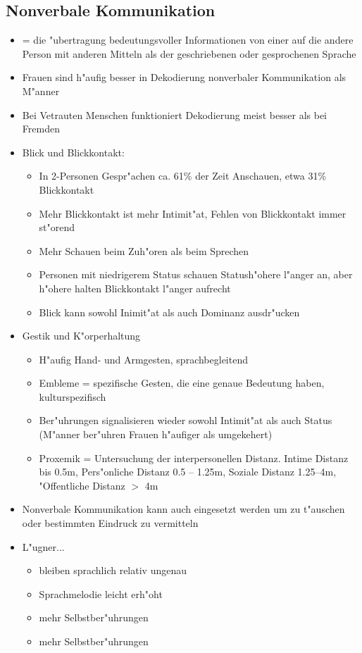 \subsection{Nonverbale Kommunikation}
\begin{itemize}
	\item
		= die "ubertragung bedeutungsvoller Informationen von einer auf die andere Person mit anderen Mitteln als der geschriebenen oder gesprochenen Sprache
	\item
		Frauen sind h"aufig besser in Dekodierung nonverbaler Kommunikation als M"anner

	\item
		Bei Vetrauten Menschen funktioniert Dekodierung meist besser als bei Fremden
	\item
		Blick und Blickkontakt:
		\begin{itemize}
			\item
				In 2-Personen Gespr"achen ca. 61\% der Zeit Anschauen, etwa 31\% Blickkontakt
			\item
				Mehr Blickkontakt ist mehr Intimit"at, Fehlen von Blickkontakt immer st"orend
			\item
				Mehr Schauen beim Zuh"oren als beim Sprechen
			\item
				Personen mit niedrigerem Status schauen Statush"ohere l"anger an, aber h"ohere halten Blickkontakt l"anger aufrecht
			\item
				Blick kann sowohl Inimit"at als auch Dominanz ausdr"ucken
		\end{itemize}
	\item
		Gestik und K"orperhaltung
		\begin{itemize}
			\item
				H"aufig Hand- und Armgesten, sprachbegleitend
			\item
				Embleme = spezifische Gesten, die eine genaue Bedeutung haben, kulturspezifisch
			\item
				Ber"uhrungen signalisieren wieder sowohl Intimit"at als auch Status (M"anner ber"uhren Frauen h"aufiger als umgekehert)
			\item
				Proxemik = Untersuchung der interpersonellen Distanz. Intime Distanz bis 0.5m, Pers"onliche Distanz 0.5 -- 1.25m, Soziale Distanz 1.25--4m, "Offentliche Distanz $>$ 4m
		\end{itemize}

	\item
		Nonverbale Kommunikation kann auch eingesetzt werden um zu t"auschen oder bestimmten Eindruck zu vermitteln
	\item
		L"ugner...
		\begin{itemize}
			\item
				bleiben sprachlich relativ ungenau
			\item
				Sprachmelodie leicht erh"oht
			\item
				mehr Selbstber"uhrungen
			\item
				mehr Selbstber"uhrungen

		\end{itemize}
\end{itemize}


